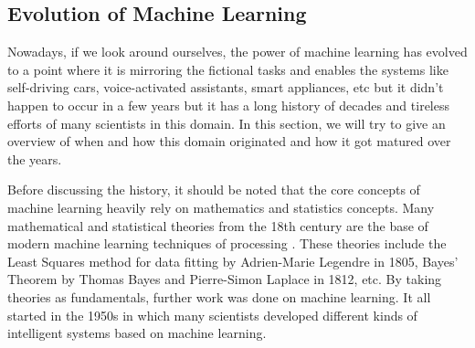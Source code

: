 \subsection{Evolution of Machine Learning}
Nowadays, if we look around ourselves, the power of machine learning has evolved to a point where it is mirroring the fictional tasks and enables the systems like self-driving cars, voice-activated assistants, smart appliances, etc but it didn't happen to occur in a few years but it has a long history of decades and tireless efforts of many scientists in this domain. In this section, we will try to give an overview of when and how this domain originated and how it got matured over the years.
\newline
\par
Before discussing the history, it should be noted that the core concepts of machine learning heavily rely on mathematics and statistics concepts. Many mathematical and statistical theories from the 18th century are the base of modern machine learning techniques of processing \cite{ml_history1} \cite{ml_history2} \cite{ml_history3}. These theories include the Least Squares method for data fitting by Adrien-Marie Legendre in 1805, Bayes' Theorem by Thomas Bayes and Pierre-Simon Laplace in 1812, etc. By taking theories as fundamentals, further work was done on machine learning. It all started in the 1950s in which many scientists developed different kinds of intelligent systems based on machine learning. 
\newline

